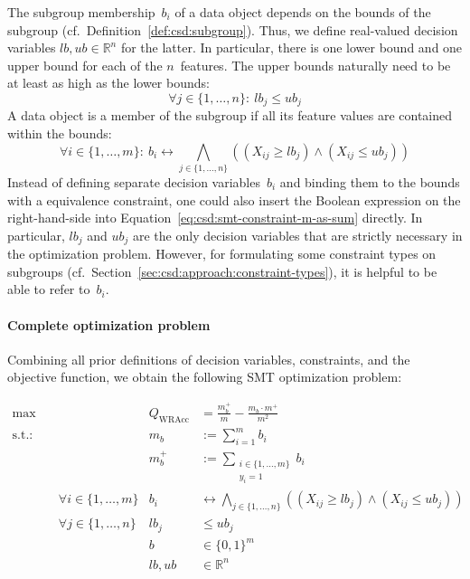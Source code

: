 \documentclass{article}
\theoremstyle{definition}
\begin{document}
The subgroup membership~$b_i$ of a data object depends on the bounds of the subgroup (cf.~Definition~\ref{def:csd:subgroup}).
Thus, we define real-valued decision variables $\mathit{lb}, \mathit{ub} \in \mathbb{R}^n$ for the latter.
In particular, there is one lower bound and one upper bound for each of the $n$~features.
The upper bounds naturally need to be at least as high as the lower bounds:
%
\begin{equation}
	\forall j \in \{1, \dots, n\}:~ \mathit{lb}_j\leq \mathit{ub}_j
	\label{eq:csd:smt-constraint-bounds-monotonic}
\end{equation}
%
A data object is a member of the subgroup if all its feature values are contained within the bounds:
%
\begin{equation}
	\forall i \in \{1, \dots, m\}:~ b_i\leftrightarrow \bigwedge_{j \in \{1, \dots, n\}} \left( \left( X_{ij} \geq \mathit{lb}_j \right) \land \left( X_{ij} \leq \mathit{ub}_j \right) \right)
	\label{eq:csd:smt-constraint-subgroup-membership}
\end{equation}
%
Instead of defining separate decision variables~$b_i$ and binding them to the bounds with a equivalence constraint, one could also insert the Boolean expression on the right-hand-side into Equation~\ref{eq:csd:smt-constraint-m-as-sum} directly.
In particular, $\mathit{lb}_j$ and $\mathit{ub}_j$ are the only decision variables that are strictly necessary in the optimization problem.
However, for formulating some constraint types on subgroups (cf.~Section~\ref{sec:csd:approach:constraint-types}), it is helpful to be able to refer to~$b_i$.

\paragraph{Complete optimization problem}

Combining all prior definitions of decision variables, constraints, and the objective function, we obtain the following SMT optimization problem:

\begin{equation}
	\begin{aligned}
		\max &\quad & Q_{\text{WRAcc}} &= \frac{m_b^+}{m} - \frac{m_b \cdot m^+}{m^2} \\
		\text{s.t.:} &\quad & m_b &:= \sum_{i=1}^{m} b_i \\
		&\quad & m_b^+ &:= \sum_{\substack{i \in \{1, \dots, m\} \\ y_i = 1 }} b_i \\
		&\quad \forall i \in \{1, \dots, m\} & b_i &\leftrightarrow \bigwedge_{j \in \{1, \dots, n\}} \left( \left( X_{ij} \geq \mathit{lb}_j \right) \land \left( X_{ij} \leq \mathit{ub}_j \right) \right) \\
		&\quad \forall j \in \{1, \dots, n\} & \mathit{lb}_j &\leq \mathit{ub}_j \\
		&\quad & b &\in \{0, 1\}^m \\
		&\quad & \mathit{lb}, \mathit{ub} &\in \mathbb{R}^n
	\end{aligned}
	\label{eq:csd:smt-problem-unconstrained-complete}
\end{equation}
\end{document}
